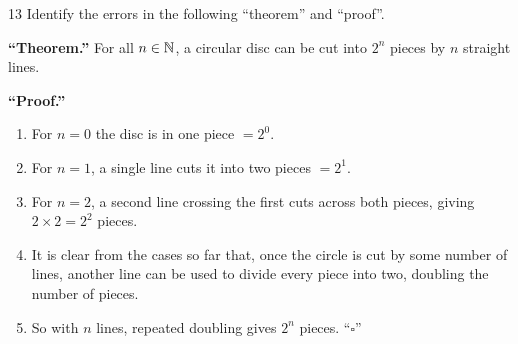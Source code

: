 \begin{exercise}{13}
    Identify the errors in the following ``theorem'' and ``proof''.

    \textbf{``Theorem.''} For all $n\in\mathbb{N}$, a circular disc can be cut into $2^n$
    pieces by $n$ straight lines.

    \textbf{``Proof.''}
    \begin{enumerate}
        \item For $n=0$ the disc is in one piece $=2^0$.
        \item For $n=1$, a single line cuts it into two pieces $=2^1$.
        \item For $n=2$, a second line crossing the first cuts across both pieces,
              giving $2\times2=2^2$ pieces.
        \item It is clear from the cases so far that, once the circle is cut by
              some number of lines, another line can be used to divide every
              piece into two, doubling the number of pieces.
        \item So with $n$ lines, repeated doubling gives $2^n$ pieces. ``$\square$''
    \end{enumerate}
\end{exercise}
\begin{solbox}
\begin{solution}

\end{solution}
\end{solbox}

